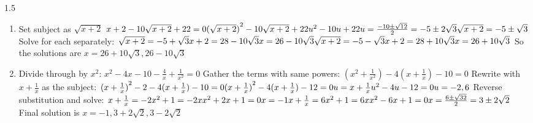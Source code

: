 \documentclass[../main.tex]{subfiles}
\begin{document}
\begin{spacing}{1.5}
\begin{enumerate}
    \item
    Set subject as \(\sqrt{x + 2}\)
    \(
    x + 2 - 10\sqrt{x+2} + 22 = 0\\
    {(\sqrt{x+2})}^2 - 10\sqrt{x+2} + 22\\
    u^2 - 10u + 22\\
    u = \frac{-10 \pm \sqrt{12}}{2} = -5 \pm 2\sqrt{3}\\
    \sqrt{x+2}=-5 \pm \sqrt{3}
    \)
    Solve for each separately:
    \(
    \sqrt{x+2}=-5 + \sqrt{3}\\
    x + 2 = 28 - 10\sqrt{3}\\
    x = 26 - 10\sqrt{3}\\
    \sqrt{x+2}=-5 - \sqrt{3}\\
    x + 2 = 28 + 10\sqrt{3}\\
    x = 26 + 10\sqrt{3}\\
    \)
    So the solutions are \(x = 26 + 10\sqrt{3}, 26 - 10\sqrt{3}\)

    \item 
    Divide through by $x^2$:
    \(x^2 -4x - 10 -\frac{4}{x} +\frac{1}{x^2} = 0\)
    Gather the terms with same powers:
    \((x^2 + \frac{1}{x^2}) - 4(x + \frac{1}{x}) - 10 = 0\)
    Rewrite with $x + \frac{1}{x}$ as the subject:
    \(
    {(x + \frac{1}{x})}^2 - 2 - 4(x + \frac{1}{x}) - 10 = 0\\
    {(x + \frac{1}{x})}^2 - 4(x + \frac{1}{x}) - 12 = 0\\
    u = x+\frac{1}{x}\\
    u^2 - 4u - 12 = 0\\
    u = -2, 6
    \)
    Reverse substitution and solve:
    \(
    x+\frac{1}{x}=-2\\
    x^2 + 1 = -2x\\
    x^2 +2x + 1=0\\
    x = -1\\
    x+\frac{1}{x}=6\\
    x^2 + 1 = 6x\\
    x^2 -6x + 1=0\\
    x = \frac{6 \pm \sqrt{32}}{2} = 3 \pm 2\sqrt{2}
    \)
    Final solution is $x=-1, 3+2\sqrt{2}, 3-2\sqrt{2}$
\end{enumerate}


\end{spacing}
\end{document}
